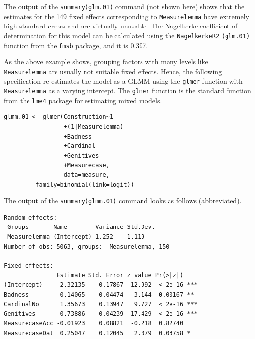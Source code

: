 The output of the \texttt{summary(glm.01)} command (not shown here) shows that the estimates for the 149 fixed effects corresponding to \texttt{Measurelemma} have extremely high standard errors and are virtually unusable.
The Nagelkerke coefficient of determination for this model can be calculated using the \texttt{NagelkerkeR2} \texttt{(glm.01)} function from the \texttt{fmsb} package, and it is 0.397.

As the above example shows, grouping factors with many levels like \texttt{Measurelemma} are usually not suitable fixed effects.
Hence, the following specification re-estimates the model as a GLMM using the \texttt{glmer} function with \texttt{Measurelemma} as a varying intercept.
The \texttt{glmer} function is the standard function from the \texttt{lme4} package for estimating mixed models.

\vspace{0.5\baselineskip}

\begin{lstlisting}
glmm.01 <- glmer(Construction~1
                 +(1|Measurelemma)
                 +Badness
                 +Cardinal
                 +Genitives
                 +Measurecase,
                 data=measure,
		 family=binomial(link=logit))
\end{lstlisting}

The output of the \texttt{summary(glmm.01)} command looks as follows (abbreviated).

\vspace{0.5\baselineskip}

\begin{lstlisting}
Random effects:
 Groups       Name        Variance Std.Dev.
 Measurelemma (Intercept) 1.252    1.119   
Number of obs: 5063, groups:  Measurelemma, 150

Fixed effects:
               Estimate Std. Error z value Pr(>|z|)    
(Intercept)    -2.32135    0.17867 -12.992  < 2e-16 ***
Badness        -0.14065    0.04474  -3.144  0.00167 ** 
CardinalNo      1.35673    0.13947   9.727  < 2e-16 ***
Genitives      -0.73886    0.04239 -17.429  < 2e-16 ***
MeasurecaseAcc -0.01923    0.08821  -0.218  0.82740    
MeasurecaseDat  0.25047    0.12045   2.079  0.03758 *  
\end{lstlisting}

